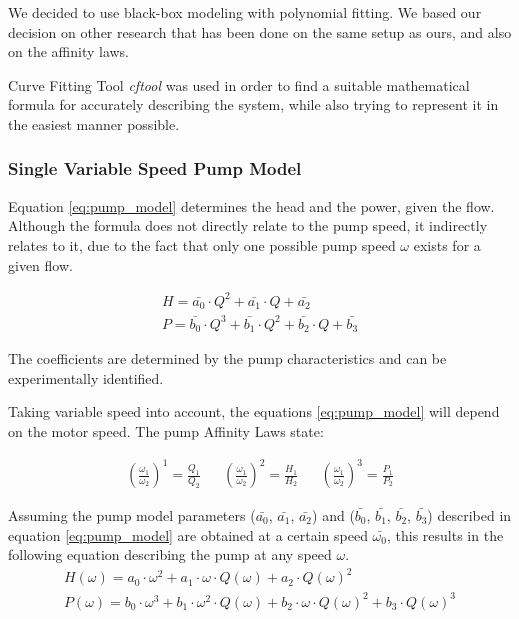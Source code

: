 We decided to use black-box modeling with polynomial fitting. We based our decision on other research that has been done on the same
setup as ours, and also on the affinity laws.

Curve Fitting Tool \cite{cftool} \textit{cftool} was used in order to find a suitable mathematical formula for accurately describing the 
system, while also trying to represent it in the easiest manner possible. 
\subsubsection{Single Variable Speed Pump Model}
Equation \ref{eq:pump_model} determines the head and the power, given the flow. 
Although the formula does not directly relate to the pump speed, it indirectly relates to it, due to the fact that only one possible 
pump speed $\omega$ exists for a given flow.

\begin{equation}
	\begin{aligned}
	H = \bar{a_{0}} \cdot Q^2 + \bar{a_{1}} \cdot Q + \bar{a_{2}} \\
	P = \bar{b_{0}} \cdot Q^3 + \bar{b_{1}} \cdot Q^2 + \bar{b_{2}} \cdot Q + \bar{b_{3}}
	\end{aligned}
	\label{eq:pump_model}
\end{equation}

The coefficients are determined by the pump characteristics and can be experimentally identified.

Taking variable speed into account, the equations \ref{eq:pump_model} will depend on the motor speed. 
The pump Affinity Laws state:

\begin{align}
	\left(\frac{\omega_1}{\omega_2}\right)^1 = \frac{Q_1}{Q_2} && 
	\left(\frac{\omega_1}{\omega_2}\right)^2 = \frac{H_1}{H_2} &&
	\left(\frac{\omega_1}{\omega_2}\right)^3 = \frac{P_1}{P_2}	
\end{align}

\newpage
Assuming the pump model parameters ($\bar{a_{0}}$, $\bar{a_{1}}$, $\bar{a_{2}}$) and ($\bar{b_{0}}$, $\bar{b_{1}}$, $\bar{b_{2}}$, $\bar{b_{3}}$) 
described in equation \ref{eq:pump_model} are obtained at a certain speed $\bar{\omega_{0}}$, 
this results in the following equation describing the pump at any speed $\omega$.
\begin{equation}
	\begin{aligned}
	H(\omega) = a_0 \cdot \omega^2 + a_1 \cdot \omega \cdot Q(\omega) + a_2 \cdot Q(\omega)^2 \\
	P(\omega) = b_0 \cdot \omega^3 + b_1 \cdot \omega^2 \cdot Q(\omega) + b_2 \cdot \omega \cdot Q(\omega)^2 + b_3 \cdot Q(\omega)^3
	\end{aligned}
\end{equation}


